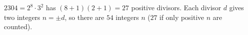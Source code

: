 $2304=2^8\cdot3^2$ has $(8+1)(2+1)=27$ positive divisors. Each divisor $d$ gives two integers $n=\pm d$, so there are $\boxed{54}$ integers $n$ ($27$ if only positive $n$ are counted).
